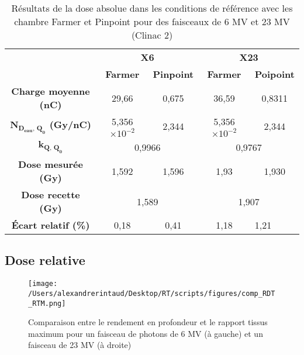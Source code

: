 \documentclass{article}
\begin{document}
\begin{table}[h]
  \centering
  \begin{tabular}{c|cc|cc|}
  \cline{2-5}
                                             & \multicolumn{2}{c|}{\textbf{X6}}    & \multicolumn{2}{c|}{\textbf{X23}}   \\ \cline{2-5} 
                                             & \textbf{Farmer} & \textbf{Pinpoint} & \textbf{Farmer} & \textbf{Poipoint} \\ \hline
  \multicolumn{1}{|c|}{\textbf{Charge moyenne (nC)}} & 29,66           & 0,675             & 36,59           & 0,8311            \\
  \multicolumn{1}{|c|}{\textbf{$\mathbf{N_{D_{eau},\, Q_0}}$ (Gy/nC)}} & 5,356$\times 10^{-2}$ & 2,344 & 5,356$\times 10^{-2}$ & 2,344                     \\
  \multicolumn{1}{|c|}{\textbf{$\mathbf{k_{Q,\, Q_0}}$}}       & \multicolumn{2}{c|}{0,9966}   & \multicolumn{2}{c|}{0,9767}                       \\
  \multicolumn{1}{|c|}{\textbf{Dose mesurée (Gy)}}   & 1,592           & 1,596             & 1,93            & 1,930             \\
  \multicolumn{1}{|c|}{\textbf{Dose recette (Gy)}}             & \multicolumn{2}{c|}{1,589}    & \multicolumn{2}{c|}{1,907}                        \\
  \multicolumn{1}{|c|}{\textbf{Écart relatif (\%)}}            & 0,18                  & 0,41  & 1,18                  & \multicolumn{1}{l|}{1,21} \\ \hline
  \end{tabular}
  \caption{Résultats de la dose absolue dans les conditions de référence avec les chambre Farmer et Pinpoint pour des faisceaux de 6 MV et 23 MV (Clinac 2)}
  \end{table}

\subsection{Dose relative}

\begin{figure}[h]
  \centering
  \texttt{[image: /Users/alexandrerintaud/Desktop/RT/scripts/figures/comp\_RDT\_RTM.png]}
  \caption{Comparaison entre le rendement en profondeur et le rapport tissus maximum pour un faisceau de photons de 6 MV (à gauche) et un faisceau de 23 MV (à droite)}
  \label{fig_rdt_rtm}
\end{figure}

\clearpage


\nocite{*}
\end{document}
